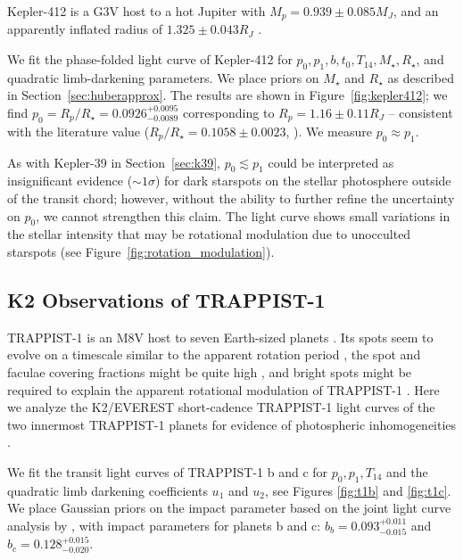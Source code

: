 Kepler-412 is a G3V host to a hot Jupiter with $M_p = 0.939 \pm 0.085 M_J$, and an apparently inflated radius of $1.325 \pm 0.043 R_J$ \citep{Deleuil2014}. 

We fit the phase-folded \kepler light curve of Kepler-412 for $p_0, p_1, b, t_0, T_{14}, M_\star, R_\star$, and quadratic limb-darkening parameters. We place priors on $M_\star$ and $R_\star$ as described in Section~\ref{sec:huberapprox}. The results are shown in Figure~\ref{fig:kepler412}; we find $p_0 = R_p/R_\star = 0.0926_{-0.0089}^{+0.0095}$ corresponding to $R_p = 1.16 \pm 0.11 R_J$ -- consistent with the literature value ($R_p/R_\star = 0.1058 \pm 0.0023$, \citealt{Deleuil2014}). We measure $p_0 \approx p_1$. 

As with Kepler-39 in Section~\ref{sec:k39}, $p_0 \lesssim p_1$ could be interpreted as insignificant evidence ($\sim 1 \sigma$) for dark starspots on the stellar photosphere outside of the transit chord;  however, without the ability to further refine the uncertainty on $p_0$, we cannot strengthen this claim. The \kepler light curve shows small variations in the stellar intensity that may be rotational modulation due to unocculted starspots (see Figure~\ref{fig:rotation_modulation}).


\subsection{K2 Observations of TRAPPIST-1}

TRAPPIST-1 is an M8V host to seven Earth-sized planets \citep{Gillon2016,Gillon2017,Luger2017,Delrez2018}. Its spots seem to evolve on a timescale similar to the apparent rotation period \citep{Roettenbacher2017}, the spot and faculae covering fractions might be quite high \citep{Rackham2018,Zhang2018}, and bright spots might be required to explain the apparent rotational modulation of TRAPPIST-1 \citep{Morris2018c}. Here we analyze the K2/EVEREST short-cadence TRAPPIST-1 light curves of the two innermost TRAPPIST-1 planets for evidence of photospheric inhomogeneities \citep{Luger2016,luger2017everest}.

We fit the transit light curves of TRAPPIST-1 b and c for $p_0, p_1, T_{14}$ and the quadratic limb darkening coefficients $u_1$ and $u_2$, see Figures \ref{fig:t1b} and \ref{fig:t1c}. We place Gaussian priors on the impact parameter based on the joint light curve analysis by \citep{Luger2017}, with impact parameters for planets b and c: $b_b = {0.093}_{-0.015}^{+0.011}$ and
$b_c = {0.128}_{-0.020}^{+0.015}$. 

